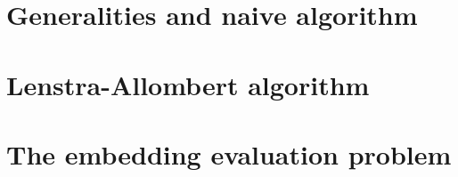 \section{Generalities and naive algorithm}
\section{Lenstra-Allombert algorithm}
\section{The embedding evaluation problem}
